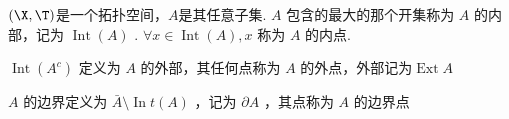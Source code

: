 \begin{definition}
	$(\X,\T)$是一个拓扑空间，$A$是其任意子集. $A$ 包含的最大的那个开集称为 $A$ 的内部，记为 $\operatorname{Int}(A)$ . $\forall x \in \operatorname{Int}(A), x$ 称为 $A$ 的内点.
	
	$\operatorname{Int}\left(A^c\right)$ 定义为 $A$ 的外部，其任何点称为 $A$ 的外点，外部记为$\operatorname{Ext}A $
	
	$A$ 的边界定义为 $\bar{A}\setminus\operatorname{In} t(A)$ ，记为 $\partial A$ ，其点称为 $A$ 的边界点
\end{definition}

